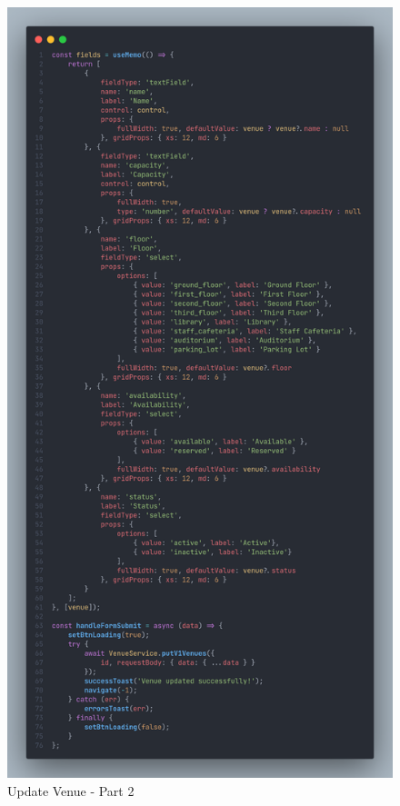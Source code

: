 \begin{justify}
\begin{itemize}
                \begin{figure}[H]
                    \centerline{\includegraphics[width=120mm,scale=1]{figures/implementation_and_testing/implementation/frontend/update_venue-2.png}}
                    \caption{Update Venue - Part 2}
                \end{figure}
    

\end{itemize}
\end{justify}
